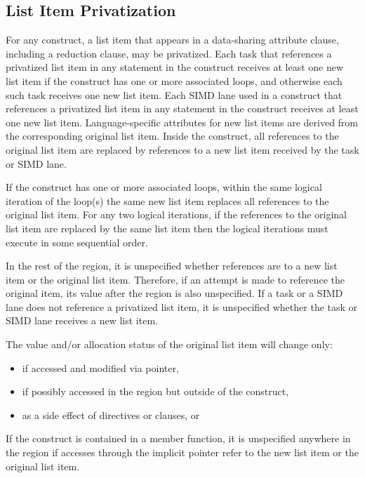 \subsection{List Item Privatization}
\label{subsec:List Item Privatization}

For any construct, a list item that appears in a data-sharing attribute
clause, including a reduction clause, may be privatized. Each task that
references a privatized list item in any statement in the construct receives
at least one new list item if the construct has one or more associated loops,
and otherwise each such task receives one new list item.  Each SIMD lane used
in a  construct that references a privatized list item in any
statement in the construct receives at least one new list item.
Language-specific attributes for new list items are derived from the
corresponding original list item. Inside the construct, all references to the
original list item are replaced by references to a new list item received by
the task or SIMD lane.  

If the construct has one or more associated loops, within the same logical
iteration of the loop(s) the same new list item replaces all references to the
original list item. For any two logical iterations, if the references to the
original list item are replaced by the same list item then the logical
iterations must execute in some sequential order.

In the rest of the region, it is unspecified whether references are
to a new list item or the original list item. Therefore, if an attempt is made
to reference the original item, its value after the region is also
unspecified. If a task or a SIMD lane does not reference a privatized list
item, it is unspecified whether the task or SIMD lane receives a new list
item.

The value and/or allocation status of the original list item will change only:

\begin{itemize}
\item if accessed and modified via pointer,

\item if possibly accessed in the region but outside of the construct,

\item as a side effect of directives or clauses, or

\end{itemize}
%
\begin{cppspecific}
If the construct is contained in a member function, it is unspecified
anywhere in the region if accesses through the implicit 
pointer refer to the new list item or the original list item.
\end{cppspecific}
%

